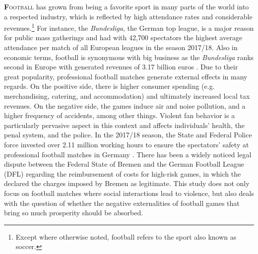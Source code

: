 
\lettrine[lines=2,nindent=0pt]{\color{darkgray}\textbf{F}}{ootball} has grown from being a favorite sport in many parts of the world into a respected industry, which is reflected by high attendance rates and considerable revenues.\footnote{Except where otherwise noted, football refers to the sport also known as soccer.} For instance, the \textit{Bundesliga}, the German top league, is a major reason for public mass gatherings and had with 42,700 spectators the highest average attendance per match of all European leagues in the season 2017/18. Also in economic terms, football is synonymous with big business as the \textit{Bundesliga} ranks second in Europe with generated revenues of 3.17 billion euros \citep{deloitte2019report}. Due to their great popularity, professional football matches generate external effects in many regards. On the positive side, there is higher consumer spending (e.g. merchandising, catering, and accommodation) and ultimately increased local tax revenues. On the negative side, the games induce air and noise pollution, and a higher frequency of accidents, among other things. Violent fan behavior is a particularly pervasive aspect in this context and affects individuals' health, the penal system, and the police. In the 2017/18 season, the State and Federal Police force invested over 2.11 million working hours to ensure the spectators' safety at professional football matches in Germany \citep{zis17_18}. There has been a widely noticed legal dispute between the Federal State of Bremen and the German Football League (DFL) regarding the reimbursement of costs for high-risk games, in which the \cite{fac_2019} declared the charges imposed by Bremen as legitimate. This study does not only focus on football matches where social interactions lead to violence, but also deals with the question of whether the negative externalities of football games that bring so much prosperity should be absorbed. 




